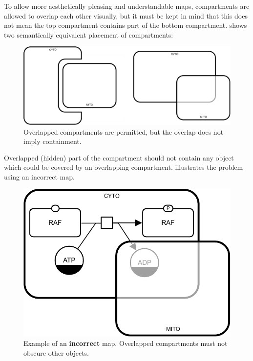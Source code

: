 To allow more aesthetically pleasing and understandable maps, compartments are allowed to overlap each other visually, but it must be kept in mind that this does not mean the top compartment contains part of the bottom compartment.
 shows two semantically equivalent placement of compartments:

\begin{figure}[H]
  \centering
  \includegraphics[scale = 0.5]{examples/compartment_overlapping}
  \caption{Overlapped compartments are permitted, but the overlap does not imply containment.}
  \label{fig:overlap}
\end{figure}

Overlapped (hidden) part of the compartment should not contain any object which could be covered by an overlapping compartment.
 illustrates the problem using an incorrect map.

\begin{figure}[H]
  \centering
  \includegraphics[scale = 0.8]{examples/compartment_overlapping_wrong}
  \caption{Example of an \textbf{incorrect} map.  Overlapped compartments must not obscure other objects.}
  \label{fig:overlap-bad}
\end{figure}

